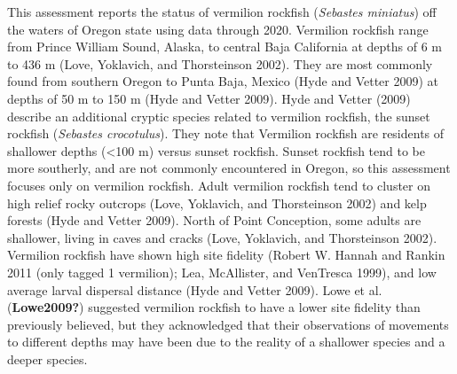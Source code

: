 \documentclass[11pt,
  english,
  a4paper,
]{article}
\begin{document}
This assessment reports the status of vermilion rockfish (\emph{Sebastes miniatus}) off the waters of Oregon state using data through 2020. Vermilion rockfish range from Prince William Sound, Alaska, to central Baja California at depths of 6 m to 436 m {(Love, Yoklavich, and Thorsteinson 2002)\leavevmode\tagmcend\tagstructend}. They are most commonly found from southern Oregon to Punta Baja, Mexico {(Hyde and Vetter 2009)\leavevmode\tagmcend\tagstructend} at depths of 50 m to 150 m {(Hyde and Vetter 2009)\leavevmode\tagmcend\tagstructend}. Hyde and Vetter {(2009)\leavevmode\tagmcend\tagstructend} describe an additional cryptic species related to vermilion rockfish, the sunset rockfish (\emph{Sebastes crocotulus}). They note that Vermilion rockfish are residents of shallower depths (\textless100 m) versus sunset rockfish. Sunset rockfish tend to be more southerly, and are not commonly encountered in Oregon, so this assessment focuses only on vermilion rockfish. Adult vermilion rockfish tend to cluster on high relief rocky outcrops {(Love, Yoklavich, and Thorsteinson 2002)\leavevmode\tagmcend\tagstructend} and kelp forests {(Hyde and Vetter 2009)\leavevmode\tagmcend\tagstructend}. North of Point Conception, some adults are shallower, living in caves and cracks {(Love, Yoklavich, and Thorsteinson 2002)\leavevmode\tagmcend\tagstructend}. Vermilion rockfish have shown high site fidelity {(Robert W. Hannah and Rankin 2011 (only tagged 1 vermilion); Lea, McAllister, and VenTresca 1999)\leavevmode\tagmcend\tagstructend}, and low average larval dispersal distance {(Hyde and Vetter 2009)\leavevmode\tagmcend\tagstructend}. Lowe et al. {(\textbf{Lowe2009?})\leavevmode\tagmcend\tagstructend} suggested vermilion rockfish to have a lower site fidelity than previously believed, but they acknowledged that their observations of movements to different depths may have been due to the reality of a shallower species and a deeper species.

\leavevmode\tagmcend\tagstructend\par
\end{document}
